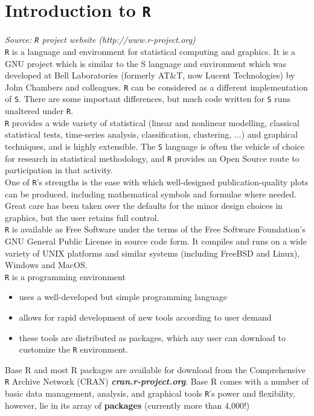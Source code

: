 \documentclass[a4paper,12pt]{article}
\begin{document}
\tableofcontents
\newpage

\section{Introduction to \texttt{R}}
\emph{Source: \texttt{R} project website (http://www.r-project.org)}\\

\noindent \texttt{R} is a language and environment for statistical computing and graphics. It is a GNU project which is similar to the S language and environment which was developed at Bell Laboratories (formerly AT\&T, now Lucent Technologies) by John Chambers and colleagues. \texttt{R} can be considered as a different implementation of \texttt{S}. There are some important differences, but much code written for \texttt{S} runs unaltered under \texttt{R}.\\

\noindent \texttt{R} provides a wide variety of statistical (linear and nonlinear modelling, classical statistical tests, time-series analysis, classification, clustering, ...) and graphical techniques, and is highly extensible. The \texttt{S} language is often the vehicle of choice for research in statistical methodology, and \texttt{R} provides an Open Source route to participation in that activity.\\

\noindent One of \texttt{R}'s strengths is the ease with which well-designed publication-quality plots can be produced, including mathematical symbols and formulae where needed. Great care has been taken over the defaults for the minor design choices in graphics, but the user retains full control.\\

\noindent \texttt{R} is available as Free Software under the terms of the Free Software Foundation's GNU General Public License in source code form. It compiles and runs on a wide variety of UNIX platforms and similar systems (including FreeBSD and Linux), Windows and MacOS.\\


\texttt{R} is a programming environment
\begin{itemize}
\item uses a well-developed but simple programming language
\item allows for rapid development of new tools according to user demand
\item these tools are distributed as packages, which any user can download to customize the \texttt{R} environment.
\end{itemize}
Base R and most R packages are available for download from the Comprehensive \texttt{R} Archive Network (CRAN)
\textbf{\textit{cran.r-project.org}}. Base R comes with a number of basic data management, analysis, and graphical tools
\texttt{R}'s power and flexibility, however, lie in its array of \textbf{packages} (currently more than 4,000!)
\end{document}
